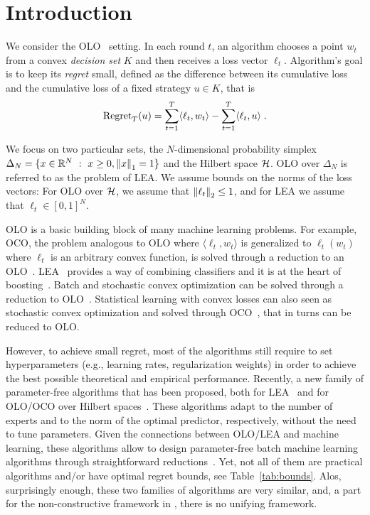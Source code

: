 \section{Introduction}
\label{section:introduction}

We consider the \ac{OLO}~\cite{Cesa-BianchiL06,Shalev-Shwartz12} setting. In each round $t$, an algorithm chooses a point
$w_t$ from a convex \emph{decision set} $K$ and then receives a loss vector
$\ell_t$. Algorithm's goal is to keep its \emph{regret} small, defined as the
difference between its cumulative loss and the cumulative loss of a fixed
strategy $u \in K$, that is
\[
\operatorname{Regret}_T(u) = \sum_{t=1}^T \langle \ell_t, w_t \rangle - \sum_{t=1}^T \langle \ell_t, u \rangle \; .
\]

We focus on two particular sets, the $N$-dimensional probability simplex
$\Delta_N = \{ x \in \mathbb{R}^N ~:~ x \ge 0, \left\|{x}\right\|_1 = 1\}$ and the Hilbert space
$\mathcal{H}$.  \ac{OLO} over $\Delta_N$ is referred to as the problem of \ac{LEA}.  We
assume bounds on the norms of the loss vectors: For \ac{OLO} over $\mathcal{H}$, we
assume that $\left\|{\ell_t}\right\|_2 \le 1$, and for \ac{LEA} we assume that
$\ell_t \in [0,1]^N$.

\ac{OLO} is a basic building block of many machine learning problems. For
example, \ac{OCO}, the problem analogous to \ac{OLO} where $\langle \ell_t, w_t \rangle$ is
generalized to $\ell_t(w_t)$ where $\ell_t$ is an arbitrary convex function, is
solved through a reduction to an \ac{OLO}~\cite{Shalev-Shwartz12}.
\ac{LEA}~\cite{LittlestoneW94, Vovk98,Cesa-BianchiFHHSW97} provides a way of
combining classifiers and it is at the heart of
boosting~\cite{FreundS97}. Batch and stochastic convex optimization
can be solved through a reduction to \ac{OLO}~\cite{Shalev-Shwartz12}.
Statistical learning with convex losses can also seen as stochastic convex
optimization and solved through \ac{OCO}~\cite{Munro51}, that in turns can be reduced to \ac{OLO}.

However, to achieve small regret, most of the algorithms still require to set
hyperparameters (e.g., learning rates, regularization weights) in
order to achieve the best possible theoretical and empirical performance.
Recently, a new family of parameter-free algorithms that has been proposed, both for \ac{LEA}~\cite{ChaudhuriFH09,ChernovV10,LuoS14,LuoS15,KoolenE15}
and for \ac{OLO}/\ac{OCO} over Hilbert spaces~\cite{StreeterM12,Orabona13, McMahanA13,McMahanO14,Orabona14}.
These algorithms adapt to the number of experts and to the norm of the optimal
predictor, respectively, without the need to tune parameters. 
Given the connections between \ac{OLO}/\ac{LEA} and machine learning, these algorithms
allow to design parameter-free batch machine learning algorithms through
straightforward reductions~\cite{Orabona14,LuoS15}.
Yet, not all of them are practical algorithms and/or have optimal regret bounds, see Table~\ref{tab:bounds}.
Alos, surprisingly enough, these two families of algorithms are very similar, and, a part for the non-constructive framework in \cite{FosterRS15}, there is no unifying framework.

